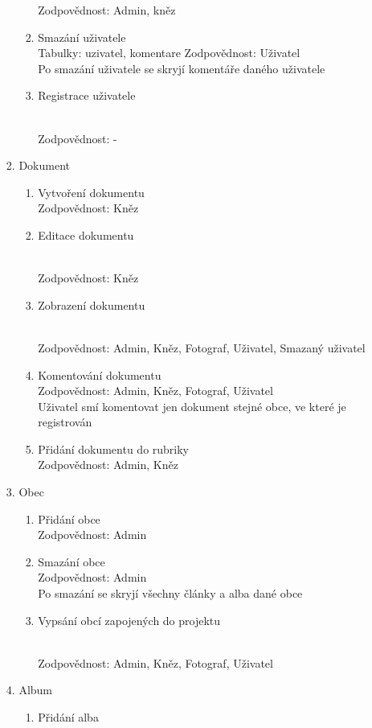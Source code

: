 \documentclass[12pt]{article}
\begin{document}
\begin{enumerate}
\begin{enumerate}[label*=\arabic*.]
\begin{enumerate}[label*=\arabic*.]
\begin{enumerate}[label*=\arabic*.]
					Zodpovědnost: Admin, kněz
					\item Smazání uživatele \\
					Tabulky: uzivatel, komentare
					Zodpovědnost: Uživatel\\
					Po smazání uživatele se skryjí komentáře daného uživatele
					\item \hypertarget{5.1.1.6}{Registrace uživatele}\\
					Zodpovědnost: -  					
				\end{enumerate}
				\item Dokument
				\begin{enumerate}[label*=\arabic*.]
					\item Vytvoření dokumentu\\
					Zodpovědnost: Kněz
					\item \hypertarget{5.1.2.2}{Editace dokumentu} \\
					Zodpovědnost: Kněz
					\item \hypertarget{zobraz}{Zobrazení dokumentu} \\
					Zodpovědnost: Admin, Kněz, Fotograf, Uživatel, Smazaný uživatel
					\item Komentování dokumentu \\
					Zodpovědnost: Admin, Kněz, Fotograf, Uživatel\\
					Uživatel smí komentovat jen dokument stejné obce, ve které je registrován
					\item Přidání dokumentu do rubriky\\
					Zodpovědnost: Admin, Kněz
				\end{enumerate}	
				\item Obec 
				\begin{enumerate}[label*=\arabic*.]
					\item Přidání obce\\
					Zodpovědnost: Admin
					\item Smazání obce \\
					Zodpovědnost: Admin\\
					Po smazání se skryjí všechny články a alba dané obce					
					\item \hypertarget{5.1.3.3}{Vypsání obcí zapojených do projektu} \\
					Zodpovědnost: Admin, Kněz, Fotograf, Uživatel				
				\end{enumerate}	
				\item Album
				\begin{enumerate}[label*=\arabic*.]
					\item Přidání alba\\

\end{enumerate}
\end{enumerate}
\end{enumerate}
\end{enumerate}
\end{document}
